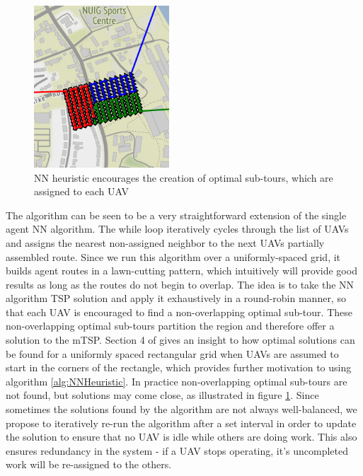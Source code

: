 \begin{figure}
\includegraphics[width=0.45\textwidth]{Chapters/MultiAgentCoverage/Figs/RAVRoutingNUIGCropped.png}
\caption{NN heuristic encourages the creation of optimal sub-tours, which are assigned to each UAV}
\label{fig:NNPartitioning}
\end{figure}
The algorithm can be seen to be a very straightforward extension of the single agent NN algorithm. The while loop iteratively cycles through the list of UAVs and assigns the nearest non-assigned neighbor to the next UAVs partially assembled route. Since we run this algorithm over a uniformly-spaced grid, it builds agent routes in a lawn-cutting pattern, which intuitively will provide good results as long as the routes do not begin to overlap. The idea is to take the NN algorithm TSP solution and apply it exhaustively in a round-robin manner, so that each UAV is encouraged to find a non-overlapping optimal sub-tour. These non-overlapping optimal sub-tours partition the region and therefore offer a solution to the mTSP. Section 4 of \cite{Hungerlander2018TheGrids} gives an insight to how optimal solutions can be found for a uniformly spaced rectangular grid when UAVs are assumed to start in the corners of the rectangle, which provides further motivation to using algorithm \ref{alg:NNHeuristic}. In practice non-overlapping optimal sub-tours are not found, but solutions may come close, as illustrated in figure \ref{fig:NNPartitioning}. Since sometimes the solutions found by the algorithm are not always well-balanced, we propose to iteratively re-run the algorithm after a set interval in order to update the solution to ensure that no UAV is idle while others are doing work. This also ensures redundancy in the system - if a UAV stops operating, it's uncompleted work will be re-assigned to the others.

